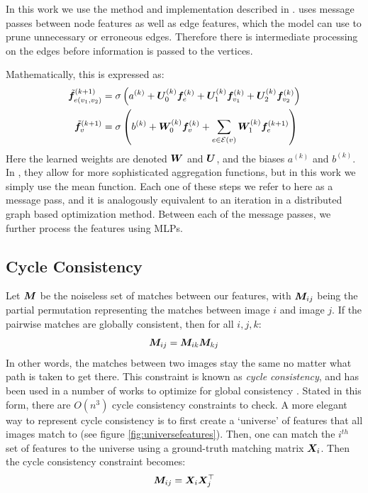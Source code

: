 \documentclass{article} %
\begin{document}
In this work we use the method and implementation described in \cite{battaglia2018relational}.
\cite{battaglia2018relational} uses message passes between node features as well as edge features, which the model can use to prune unnecessary or erroneous edges.
Therefore there is intermediate processing on the edges before information is passed to the vertices. 

Mathematically, this is expressed as: %
\begin{align}
\tilde{{\bm{f}}}_{e(v_1,v_2)}^{(k+1)} =&\; \sigma \left(a^{(k)} + {\bm{U}}_0^{(k)} {\bm{f}}_{e}^{(k)} + {\bm{U}}_1^{(k)} {\bm{f}}_{v_1}^{(k)} + {\bm{U}}_2^{(k)} {\bm{f}}_{v_2}^{(k)} \right) \\
\tilde{{\bm{f}}}_{v}^{(k+1)} =&\; \sigma\left(b^{(k)} + {\bm{W}}_0^{(k)} {\bm{f}}_{v}^{(k)} + \sum_{e \in \mathcal{E}(v)} {\bm{W}}_1^{(k)} {\bm{f}}_{e}^{(k+1)} \right) 
\end{align}
Here the learned weights are denoted ${\bm{W}}$ and ${\bm{U}}$, and the biases $a^{(k)}$ and  $b^{(k)}$.
In \cite{battaglia2018relational}, they allow for more sophisticated aggregation functions, but in this work we simply use the mean function.
Each one of these steps we refer to here as a message pass, and it is analogously equivalent to an iteration in a distributed graph based optimization method.
Between each of the message passes, we further process the features using MLPs.


\subsection{Cycle Consistency} \label{sec:cycconsist}

Let ${\bm{M}}$ be the noiseless set of matches between our features, with ${\bm{M}}_{ij}$ being the partial permutation representing the matches between image $i$ and image $j$.
If the pairwise matches are globally consistent, then for all $i, j, k$:
\begin{equation}
{\bm{M}}_{ij} = {\bm{M}}_{ik} {\bm{M}}_{kj}
\label{eq:cycconsist1}
\end{equation}
In other words, the matches between two images stay the same no matter what path is taken to get there. 
This constraint is known as \textit{cycle consistency}, and has been used in a number of works to optimize for global consistency \cite{zhou2015multi, wang2017multi, leonardos2017distributed}.
Stated in this form, there are $O(n^3)$ cycle consistency constraints to check.
A more elegant way to represent cycle consistency is to first create a `universe' of features that all images match to (see figure \ref{fig:universefeatures}).
Then, one can match the $i^{th}$ set of features to the universe using a ground-truth matching matrix ${\bm{X}}_i$.
Then the cycle consistency constraint becomes:
\begin{equation}
{\bm{M}}_{ij} = {\bm{X}}_{i}{\bm{X}}_{j}^\top
\label{eq:cycconsist2}
\end{equation}
\end{document}
